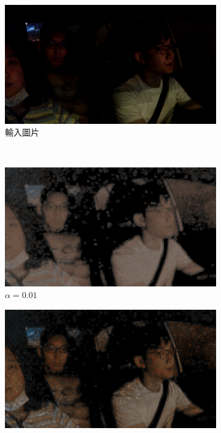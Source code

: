 \begin{figure}[htb]
\centering
\begin{subfigure}[b]{0.3\textwidth}
    \centering
    \includegraphics[width=\textwidth]{figures/alpha_input}
    \caption{輸入圖片}
\end{subfigure}
\\
\begin{subfigure}[b]{0.3\textwidth}
    \centering
    \includegraphics[width=\textwidth]{figures/alpha_001}
    \caption{$\alpha = 0.01$}
\end{subfigure}
\begin{subfigure}[b]{0.3\textwidth}
    \centering
    \includegraphics[width=\textwidth]{figures/alpha_005}

\end{subfigure}
\end{figure}
